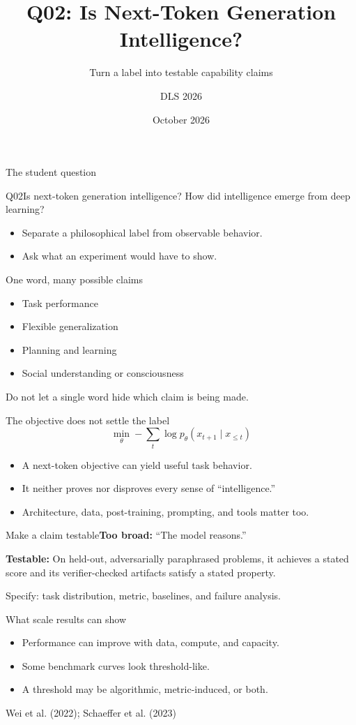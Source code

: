 \documentclass[aspectratio=169,10pt]{beamer}\usetheme{metropolis}
\title{Q02: Is Next-Token Generation Intelligence?}\subtitle{Turn a label into testable capability claims}\author{DLS 2026}\date{October 2026}
\begin{document}
\maketitle
\begin{frame}{The student question}\begin{block}{Q02}Is next-token generation intelligence? How did intelligence emerge from deep learning?\end{block}\begin{itemize}\item Separate a philosophical label from observable behavior.\item Ask what an experiment would have to show.\end{itemize}\end{frame}
\begin{frame}{One word, many possible claims}\begin{itemize}\item Task performance\item Flexible generalization\item Planning and learning\item Social understanding or consciousness\end{itemize}\alert{Do not let a single word hide which claim is being made.}\end{frame}
\begin{frame}{The objective does not settle the label}\[\min_\theta -\sum_t\log p_\theta(x_{t+1}\mid x_{\leq t})\]\begin{itemize}\item A next-token objective can yield useful task behavior.\item It neither proves nor disproves every sense of ``intelligence.''\item Architecture, data, post-training, prompting, and tools matter too.\end{itemize}\end{frame}
\begin{frame}{Make a claim testable}\textbf{Too broad:} ``The model reasons.''\par\bigskip\textbf{Testable:} On held-out, adversarially paraphrased problems, it achieves a stated score and its verifier-checked artifacts satisfy a stated property.\par\bigskip\alert{Specify: task distribution, metric, baselines, and failure analysis.}\end{frame}
\begin{frame}{What scale results can show}\begin{itemize}\item Performance can improve with data, compute, and capacity.\item Some benchmark curves look threshold-like.\item A threshold may be algorithmic, metric-induced, or both.\end{itemize}\vfill\small Wei et al. (2022); Schaeffer et al. (2023)\end{frame}
\end{document}

